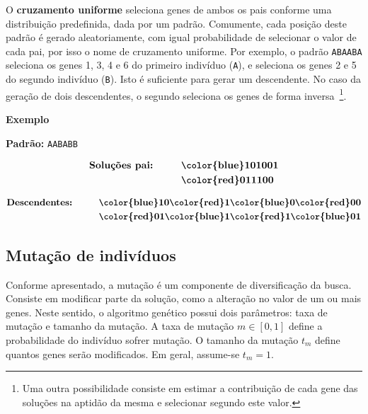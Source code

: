 O \textbf{cruzamento uniforme} seleciona genes de ambos os pais conforme uma distribuição predefinida, dada por um padrão. Comumente, cada posição deste padrão é gerado aleatoriamente, com igual probabilidade de selecionar o valor de cada pai, por isso o nome de cruzamento uniforme. Por exemplo, o padrão \texttt{ABAABA} seleciona os genes 1, 3, 4 e 6 do primeiro indivíduo (\texttt{A}), e seleciona os genes 2 e 5 do segundo indivíduo (\texttt{B}). Isto é suficiente para gerar um descendente. No caso da geração de dois descendentes, o segundo seleciona os genes de forma inversa~\footnote{Uma outra possibilidade consiste em estimar a contribuição de cada gene das soluções na aptidão da mesma e selecionar segundo este valor.}.

\insertspace
\textbf{Exemplo}

\begin{center}
	\textbf{Padrão:} \texttt{AABABB}
\end{center}
\begin{center}
	\makebox[7cm]{\hrulefill}
\end{center}
\begin{align*}
	\textbf{Soluções pai:}	& \hspace{1cm} \textbf{\color{blue}101001} \\
	& \hspace{1cm} \textbf{\color{red}011100}
\end{align*}
\begin{center}
	\makebox[7cm]{\hrulefill}
\end{center}
\begin{align*}
	\textbf{Descendentes:}	& \hspace{1cm} \textbf{{\color{blue}10}{\color{red}1}{\color{blue}0}{\color{red}00}} \\
	& \hspace{1cm} \textbf{{\color{red}01}{\color{blue}1}{\color{red}1}{\color{blue}01}}
\end{align*}

\subsection{Mutação de indivíduos}

Conforme apresentado, a mutação é um componente de diversificação da busca. Consiste em modificar parte da solução, como a alteração no valor de um ou mais genes. Neste sentido, o algoritmo genético possui dois parâmetros: taxa de mutação e tamanho da mutação. A taxa de mutação $m \in [0, 1]$ define a probabilidade do indivíduo sofrer mutação. O tamanho da mutação $t_m$ define quantos genes serão modificados. Em geral, assume-se $t_m = 1$.

